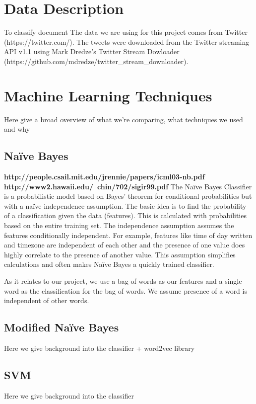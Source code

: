 \documentclass[11pt,letterpaper]{article}
\begin{document}
\section{Data Description}
To classify document The data we are using for this project comes from Twitter (https://twitter.com/). The tweets were downloaded from the Twitter streaming API v1.1 using Mark Dredze's Twitter Stream Dowloader (https://github.com/mdredze/twitter_stream_downloader).

\section{Machine Learning Techniques}
Here give a broad overview of what we're comparing, what techniques we used and why

\subsection{Na{\"i}ve Bayes}
\textbf{http://people.csail.mit.edu/jrennie/papers/icml03-nb.pdf} \textbf{http://www2.hawaii.edu/~chin/702/sigir99.pdf}
  The Na{\"i}ve Bayes Classifier is a probabilistic model based on Bayes' theorem for conditional probabilities but with a na{\"i}ve independence assumption. The basic idea is to find the probability of a classification given the data  (features). This is calculated with probabilities based on the entire training set. The independence assumption assumes the features conditionally independent. For example, features like time of day written and timezone are independent of each other and the presence of one value does highly correlate to the presence of another value. This assumption simplifies calculations and often makes Na{\"i}ve Bayes a quickly trained classifier.

As it relates to our project, we use a bag of words as our features and a single word as the classification for the bag of words. We assume presence of a word is independent of other words. 


\subsection{Modified Na{\"i}ve Bayes}
Here we give background into the classifier + word2vec library

\subsection{SVM}
Here we give background into the classifier
\end{document}
